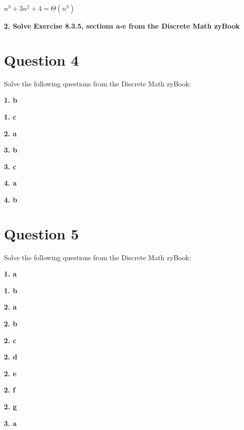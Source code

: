 \documentclass[11pt]{article}
\begin{document}
	$n^3+3n^2+4=\Theta (n^3)$
	
	\vspace{10mm}
	\textbf{2. Solve Exercise 8.3.5, sections a-e from the Discrete Math zyBook}
	
	\newpage
	\section*{Question 4}
	Solve the following questions from the Discrete Math zyBook:
	
	\textbf{1. b}
	
	\vspace{10mm}
	\textbf{1. c}
	
	\vspace{10mm}
	\textbf{2. a}
	
	\vspace{10mm}
	\textbf{3. b}
	
	\vspace{10mm}
	\textbf{3. c}
	
	\vspace{10mm}
	\textbf{4. a}
	
	\vspace{10mm}
	\textbf{4. b}
	
	\newpage
	\section*{Question 5}
	Solve the following questions from the Discrete Math zyBook:
	
	\textbf{1. a}
	
	
	\vspace{10mm}
	\textbf{1. b}
	
	\vspace{10mm}
	\textbf{2. a}
	
	\vspace{10mm}
	\textbf{2. b}
	
	\vspace{10mm}
	\textbf{2. c}
	
	\vspace{10mm}
	\textbf{2. d}
	
	\vspace{10mm}
	\textbf{2. e}
	
	\vspace{10mm}
	\textbf{2. f}
	
	\vspace{10mm}
	\textbf{2. g}
	
	
	\vspace{10mm}
	\textbf{3. a}
	
\end{document}
